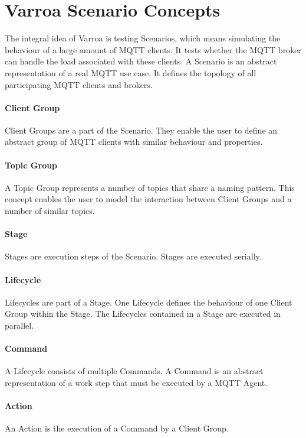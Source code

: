 \section{Varroa Scenario Concepts}
The integral idea of Varroa is testing Scenarios, which means simulating the behaviour of a large amount of MQTT clients.
It tests whether the MQTT broker can handle the load associated with these clients.
A Scenario is an abstract representation of a real MQTT use case.
It defines the topology of all participating MQTT clients and brokers.

\paragraph{Client Group}
Client Groups are a part of the Scenario.
They enable the user to define an abstract group of MQTT clients with similar behaviour and properties.

\paragraph{Topic Group}
A Topic Group represents a number of topics that share a naming pattern.
This concept enables the user to model the interaction between Client Groups and a number of similar topics.

\paragraph{Stage}
Stages are execution steps of the Scenario. Stages are executed serially.

\paragraph{Lifecycle}
Lifecycles are part of a Stage.
One Lifecycle defines the behaviour of one Client Group within the Stage.
The Lifecycles contained in a Stage are executed in parallel.

\paragraph{Command}
A Lifecycle consists of multiple Commands.
A Command is an abstract representation of a work step that must be executed by a MQTT Agent.

\paragraph{Action}
An Action is the execution of a Command by a Client Group.


